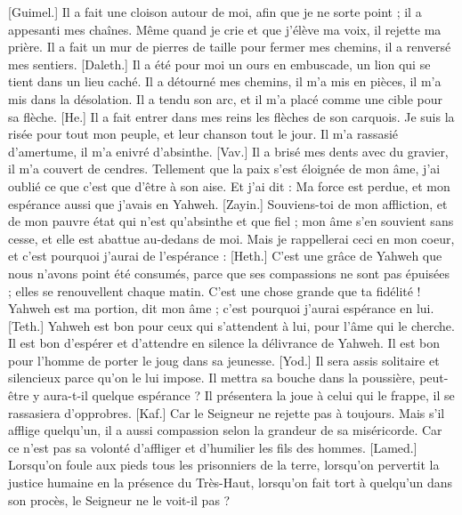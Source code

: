 \begin{multicols}{2}
[Guimel.] Il a fait une cloison autour de moi, afin que je ne sorte point ; il a appesanti mes chaînes.
Même quand je crie et que j'élève ma voix, il rejette ma prière.
Il a fait un mur de pierres de taille pour fermer mes chemins, il a renversé mes sentiers.
[Daleth.] Il a été pour moi un ours en embuscade, un lion qui se tient dans un lieu caché.
Il a détourné mes chemins, il m'a mis en pièces, il m'a mis dans la désolation.
Il a tendu son arc, et il m'a placé comme une cible pour sa flèche.
[He.] Il a fait entrer dans mes reins les flèches de son carquois.
Je suis la risée pour tout mon peuple, et leur chanson tout le jour.
Il m'a rassasié d'amertume, il m'a enivré d'absinthe.
[Vav.] Il a brisé mes dents avec du gravier, il m'a couvert de cendres.
Tellement que la paix s'est éloignée de mon âme, j'ai oublié ce que c'est que d'être à son aise.
Et j'ai dit : Ma force est perdue, et mon espérance aussi que j'avais en Yahweh.
[Zayin.] Souviens-toi de mon affliction, et de mon pauvre état qui n'est qu'absinthe et que fiel ;
mon âme s'en souvient sans cesse, et elle est abattue au-dedans de moi.
Mais je rappellerai ceci en mon coeur, et c'est pourquoi j'aurai de l'espérance :
[Heth.] C'est une grâce de Yahweh que nous n'avons point été consumés, parce que ses compassions ne sont pas épuisées ;
elles se renouvellent chaque matin. C'est une chose grande que ta fidélité !
Yahweh est ma portion, dit mon âme ; c'est pourquoi j'aurai espérance en lui.
[Teth.] Yahweh est bon pour ceux qui s'attendent à lui, pour l'âme qui le cherche.
Il est bon d'espérer et d'attendre en silence la délivrance de Yahweh.
Il est bon pour l'homme de porter le joug dans sa jeunesse.
[Yod.] Il sera assis solitaire et silencieux parce qu'on le lui impose.
Il mettra sa bouche dans la poussière, peut-être y aura-t-il quelque espérance ?
Il présentera la joue à celui qui le frappe, il se rassasiera d'opprobres.
[Kaf.] Car le Seigneur ne rejette pas à toujours.
Mais s'il afflige quelqu'un, il a aussi compassion selon la grandeur de sa miséricorde.
Car ce n'est pas sa volonté d'affliger et d'humilier les fils des hommes.
[Lamed.] Lorsqu'on foule aux pieds tous les prisonniers de la terre,
lorsqu'on pervertit la justice humaine en la présence du Très-Haut,
lorsqu'on fait tort à quelqu'un dans son procès, le Seigneur ne le voit-il pas ?

\end{multicols}
